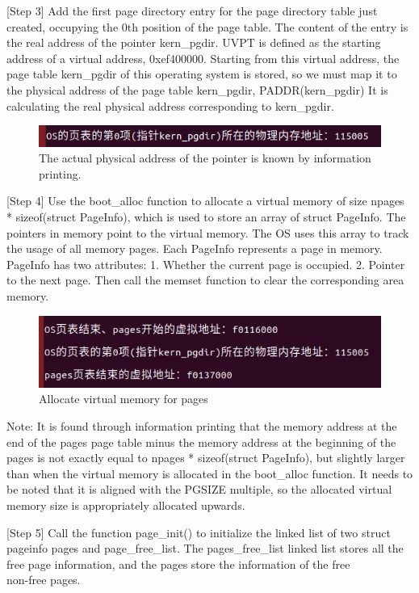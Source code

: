 [Step 3] Add the first page directory entry for the page directory table just created, occupying the 0th position of the page table. The content of the entry is the real address of the pointer kern\_pgdir. UVPT is defined as the starting address of a virtual address, 0xef400000. Starting from this virtual address, the page table kern\_pgdir of this operating system is stored, so we must map it to the physical address of the page table kern\_pgdir, PADDR(kern\_pgdir) It is calculating the real physical address corresponding to kern\_pgdir.
\begin{figure}[H]
\centering
\includegraphics[width=0.8\linewidth]{figure/real_physical_address}
\caption{The actual physical address of the pointer is known by information printing.}
\end{figure}

[Step 4] Use the boot\_alloc function to allocate a virtual memory of size npages * sizeof(struct PageInfo), which is used to store an array of struct PageInfo. The pointers in memory point to the virtual memory. The OS uses this array to track the usage of all memory pages. Each PageInfo represents a page in memory. PageInfo has two attributes: 1. Whether the current page is occupied. 2. Pointer to the next page. Then call the memset function to clear the corresponding area memory.

\begin{figure}[H]
\centering
\includegraphics[width=0.8\linewidth]{figure/pages_alloc_virtualmem}
\caption{Allocate virtual memory for pages}
\end{figure}

Note: It is found through information printing that the memory address at the end of the pages page table minus the memory address at the beginning of the pages is not exactly equal to npages * sizeof(struct PageInfo), but slightly larger than when the virtual memory is allocated in the boot\_alloc function. It needs to be noted that it is aligned with the PGSIZE multiple, so the allocated virtual memory size is appropriately allocated upwards.

[Step 5] Call the function page\_init() to initialize the linked list of two struct pageinfo pages and page\_free\_list. The pages\_free\_list linked list stores all the free page information, and the pages store the information of the free\\non-free pages.

